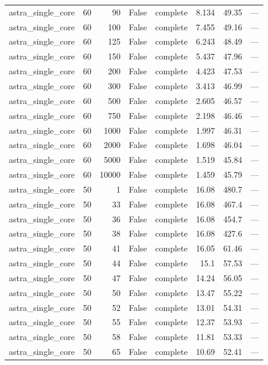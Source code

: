 \begin{tabular}{lrrrlrrl}
astra\_single\_core & 60 & 90 & False & complete & 8.134 & 49.35 & — \\
astra\_single\_core & 60 & 100 & False & complete & 7.455 & 49.16 & — \\
astra\_single\_core & 60 & 125 & False & complete & 6.243 & 48.49 & — \\
astra\_single\_core & 60 & 150 & False & complete & 5.437 & 47.96 & — \\
astra\_single\_core & 60 & 200 & False & complete & 4.423 & 47.53 & — \\
astra\_single\_core & 60 & 300 & False & complete & 3.413 & 46.99 & — \\
astra\_single\_core & 60 & 500 & False & complete & 2.605 & 46.57 & — \\
astra\_single\_core & 60 & 750 & False & complete & 2.198 & 46.46 & — \\
astra\_single\_core & 60 & 1000 & False & complete & 1.997 & 46.31 & — \\
astra\_single\_core & 60 & 2000 & False & complete & 1.698 & 46.04 & — \\
astra\_single\_core & 60 & 5000 & False & complete & 1.519 & 45.84 & — \\
astra\_single\_core & 60 & 10000 & False & complete & 1.459 & 45.79 & — \\
astra\_single\_core & 50 & 1 & False & complete & 16.08 & 480.7 & — \\
astra\_single\_core & 50 & 33 & False & complete & 16.08 & 467.4 & — \\
astra\_single\_core & 50 & 36 & False & complete & 16.08 & 454.7 & — \\
astra\_single\_core & 50 & 38 & False & complete & 16.08 & 427.6 & — \\
astra\_single\_core & 50 & 41 & False & complete & 16.05 & 61.46 & — \\
astra\_single\_core & 50 & 44 & False & complete & 15.1 & 57.53 & — \\
astra\_single\_core & 50 & 47 & False & complete & 14.24 & 56.05 & — \\
astra\_single\_core & 50 & 50 & False & complete & 13.47 & 55.22 & — \\
astra\_single\_core & 50 & 52 & False & complete & 13.01 & 54.31 & — \\
astra\_single\_core & 50 & 55 & False & complete & 12.37 & 53.93 & — \\
astra\_single\_core & 50 & 58 & False & complete & 11.81 & 53.33 & — \\
astra\_single\_core & 50 & 65 & False & complete & 10.69 & 52.41 & — \\

\end{tabular}

